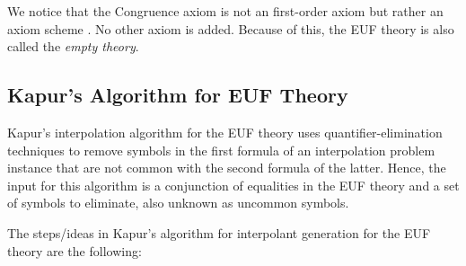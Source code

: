 \documentclass[sigconf,authordraft]{acmart}
\begin{document}
We notice that the Congruence axiom is not an first-order axiom but rather an axiom
scheme \cite{10.1145/322186.322198}. No other axiom is added. Because of this,
the EUF theory is also called the \emph{empty theory}.

\subsection{Kapur's Algorithm for EUF Theory}

Kapur's interpolation algorithm for the EUF theory uses quantifier-elimination
techniques to remove symbols in the first formula of an interpolation problem instance
that are not common with the second formula of the latter. 
Hence, the input for this algorithm is a conjunction of equalities in the
EUF theory and a set of symbols to eliminate, also unknown as uncommon symbols.

The steps/ideas in Kapur's algorithm for interpolant generation for the EUF theory
are the following:
\end{document}
